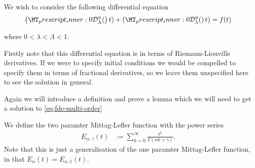 We wish to consider the following differential equation
\begin{align}
	\label{eq:fde-multi-order}
	\rld{0}{\Lambda}{y}(t) + \rld{0}{\lambda}{y}(t) = f(t)
\end{align}

where $ 0 < \lambda < \Lambda < 1 $.


Firstly note that this differential equation is in terms of Riemann-Liouville derivatives. If we were to specify
initial conditions we would be compelled to specify them in terms of fractional derivatives, so we leave them
unspecified here to see the solution in general.

Again we will introduce a definition and prove a lemma which we will need to get a solution to \ref{eq:fde-multi-order}

\begin{definition}
	\label{def:mit-lef-2}
	We define the two paramter Mittag-Lefler function with the power series
	\begin{align}
		E_{\alpha, \gamma}(t) &:= \sum_{k=0}^\infty \frac{t^k}{\Gamma(\alpha k + \gamma)}.
	\end{align}
	Note that this is just a generalisation of the one paramter Mittag-Lefler function, in that
	$ E_{\alpha}(t) = E_{\alpha, 1}(t) $.
\end{definition}

